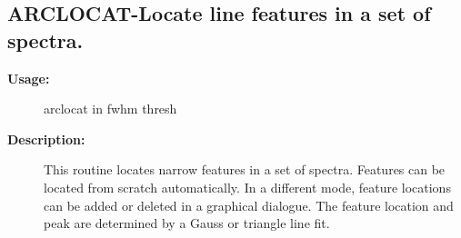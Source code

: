\subsection{ARCLOCAT-\label{ARCLOCAT}Locate line features in a set of spectra.}
\begin{description}

\item [\textbf{Usage:}]

   arclocat in fwhm thresh


\item [\textbf{Description:}]
   This routine locates narrow features in a set of spectra. Features
   can be located from scratch automatically. In a different mode,
   feature locations can be added or deleted in a graphical dialogue.
   The feature location and peak are determined by a Gauss or
   triangle line fit.



\end{description}
